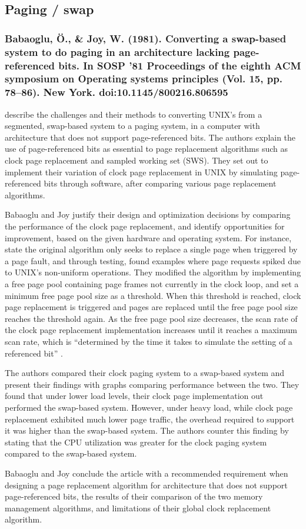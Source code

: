 \subsection{Paging / swap}

\subsubsection*{Babaoglu, Ö., \& Joy, W. (1981). Converting a swap-based system to do paging in an architecture lacking page-referenced bits. In SOSP ’81 Proceedings of the eighth ACM symposium on Operating systems principles (Vol. 15, pp. 78–86). New York. doi:10.1145/800216.806595}

\citet{Babaoglu1981} describe the challenges and their methods to converting UNIX's from a segmented, swap-based system to a paging system, in a computer with architecture that does not support page-referenced bits. The authors explain the use of page-referenced bits as essential to page replacement algorithms such as clock page replacement and sampled working set (SWS). They set out to implement their variation of clock page replacement in UNIX by simulating page-referenced bits through software, after comparing various page replacement algorithms.

Babaoglu and Joy justify their design and optimization decisions by comparing the performance of the clock page replacement, and identify opportunities for improvement, based on the given hardware and operating system. For instance, \citet[p. 80]{Babaoglu1981} state the original algorithm only seeks to replace a single page when triggered by a page fault, and through testing, found examples where page requests spiked due to UNIX's non-uniform operations. They modified the algorithm by implementing a free page pool containing page frames not currently in the clock loop, and set a minimum free page pool size as a threshold. When this threshold is reached, clock page replacement is triggered and pages are replaced until the free page pool size reaches the threshold again. As the free page pool size decreases, the scan rate of the clock page replacement implementation increases until it reaches a maximum scan rate, which is ``determined by the time it takes to simulate the setting of a referenced bit'' \citep[p. 80]{Babaoglu1981}.

The authors compared their clock paging system to a swap-based system and present their findings with graphs comparing performance between the two. They found that under lower load levels, their clock page implementation out performed the swap-based system. However, under heavy load, while clock page replacement exhibited much lower page traffic, the overhead required to support it was higher than the swap-based system. The authors counter this finding by stating that the CPU utilization was greater for the clock paging system compared to the swap-based system.

Babaoglu and Joy conclude the article with a recommended requirement when designing a page replacement algorithm for architecture that does not support page-referenced bits, the results of their comparison of the two memory management algorithms, and limitations of their global clock replacement algorithm.
